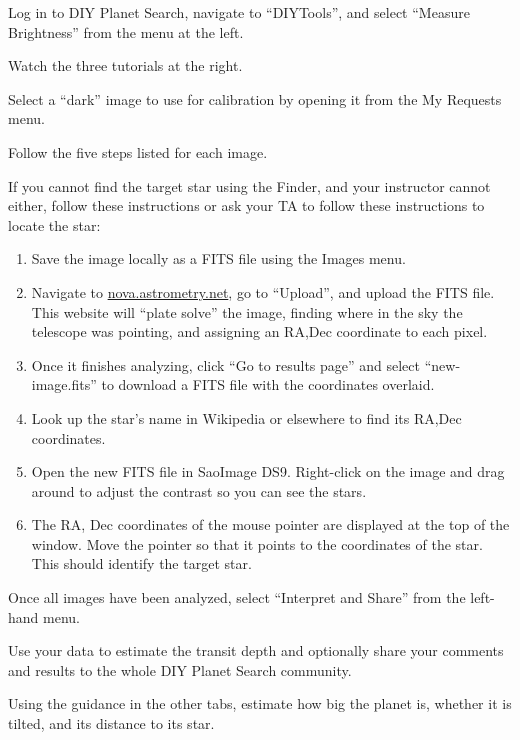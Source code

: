 \begin{steps}
	\item Log in to DIY Planet Search, navigate to ``DIYTools'', and select ``Measure Brightness'' from the menu at the left.
	
	\item Watch the three tutorials at the right.
	
	\item Select a ``dark'' image to use for calibration by opening it from the My Requests menu.
	
	\item Follow the five steps listed for each image.
	
	\item If you cannot find the target star using the Finder, and your instructor cannot either, follow these instructions or ask your TA to follow these instructions to locate the star:
	\begin{enumerate}
		\item Save the image locally as a FITS file using the Images menu.
		
		\item Navigate to \url{nova.astrometry.net}, go to ``Upload'', and upload the FITS file. This website will ``plate solve'' the image, finding where in the sky the telescope was pointing, and assigning an RA,Dec coordinate to each pixel.
		
		\item Once it finishes analyzing, click ``Go to results page'' and select ``new-image.fits'' to download a FITS file with the coordinates overlaid.
		
		\item Look up the star's name in Wikipedia or elsewhere to find its RA,Dec coordinates.
		
		\item Open the new FITS file in SaoImage DS9. Right-click on the image and drag around to adjust the contrast so you can see the stars.
		
		\item The RA, Dec coordinates of the mouse pointer are displayed at the top of the window. Move the pointer so that it points to the coordinates of the star. This should identify the target star.
	\end{enumerate}

	\item Once all images have been analyzed, select ``Interpret and Share'' from the left-hand menu.
	
	\item Use your data to estimate the transit depth and optionally share your comments and results to the whole DIY Planet Search community.
	
	\item Using the guidance in the other tabs, estimate how big the planet is, whether it is tilted, and its distance to its star.
\end{steps}

